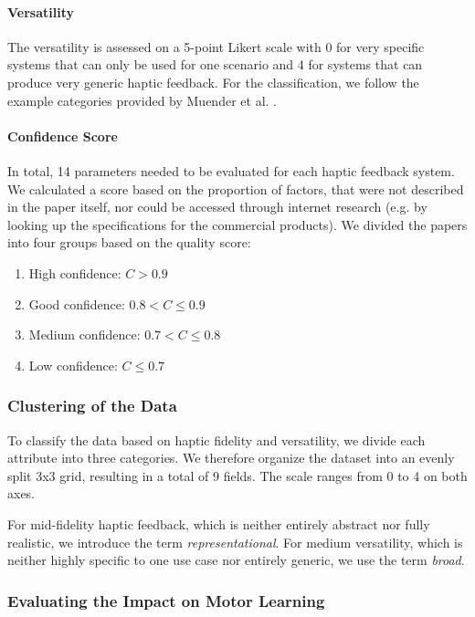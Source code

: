 \paragraph{Versatility}
The versatility is assessed on a 5-point Likert scale with 0 for very specific systems that can only be used for one scenario and 4 for systems that can produce very generic haptic feedback. For the classification, we follow the example categories provided by Muender et al. \cite{Muender2022HapticReality}.


\paragraph{Confidence Score}
\label{sec:confidence}
In total, 14 parameters needed to be evaluated for each haptic feedback system. We calculated a score based on the proportion of factors, that were not described in the paper itself, nor could be accessed through internet research (e.g. by looking up the specifications for the commercial products).
We divided the papers into four groups based on the quality score:

\begin{enumerate}
	\item High confidence: $C > 0.9$
	\item Good confidence: $0.8 < C \leq 0.9$
	\item Medium confidence: $0.7 < C \leq 0.8$
	\item Low confidence: $C \leq 0.7$
\end{enumerate} 


\subsubsection{Clustering of the Data}
To classify the data based on haptic fidelity and versatility, we divide each attribute into three categories. We therefore organize the dataset into an evenly split 3x3 grid, resulting in a total of 9 fields. The scale ranges from 0 to 4 on both axes.

For mid-fidelity haptic feedback, which is neither entirely abstract nor fully realistic, we introduce the term \textit{representational}. For medium versatility, which is neither highly specific to one use case nor entirely generic, we use the term \textit{broad}.

\subsubsection{Evaluating the Impact on Motor Learning}
\label{sec:impact_motor_learning}

